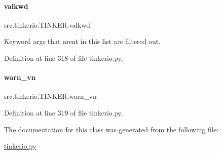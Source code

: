 \paragraph{\texorpdfstring{valkwd}{valkwd}}
{\footnotesize\ttfamily src.\+tinkerio.\+T\+I\+N\+K\+E\+R.\+valkwd}



Keyword args that aren\textquotesingle{}t in this list are filtered out. 



Definition at line 318 of file tinkerio.\+py.

\mbox{\label{classsrc_1_1tinkerio_1_1TINKER_a504b2ebca5c7f2797aa213c5a38002af}} 
\paragraph{\texorpdfstring{warn\+\_\+vn}{warn\_vn}}
{\footnotesize\ttfamily src.\+tinkerio.\+T\+I\+N\+K\+E\+R.\+warn\+\_\+vn}



Definition at line 319 of file tinkerio.\+py.



The documentation for this class was generated from the following file\+:\begin{DoxyCompactItemize}
\item 
\hyperlink{tinkerio_8py}{tinkerio.\+py}\end{DoxyCompactItemize}
